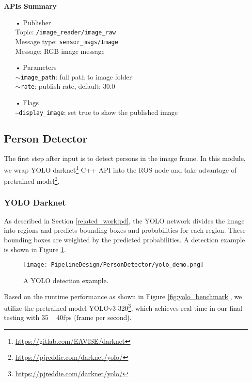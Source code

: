\textbf{APIs Summary}

\begin{itemize}
\item[•] Publisher \\
Topic: \texttt{/image\_reader/image\_raw} \\
Message type: \texttt{sensor\_msgs/Image} \\
Message: RGB image message 

\item[•] Parameters \\
\texttt{$\sim$image\_path}: full path to image folder \\
\texttt{$\sim$rate}: publish rate, default: 30.0 

\item[•] Flags \\
\texttt{---display\_image}: set true to show the published image \\
\end{itemize}


\subsection{Person Detector}
\label{pipeline:PD}
The first step after input is to detect persons in the image frame. In this module, we wrap YOLO darknet\footnote{\url{https://gitlab.com/EAVISE/darknet}} C++ API into the ROS node and take advantage of pretrained model\footnote{\url{https://pjreddie.com/darknet/yolo/}}.

\subsubsection{YOLO Darknet}
As described in Section \ref{related_work:pd}, the YOLO network \cite{DBLP:journals/corr/RedmonDGF15} divides the image into regions and predicts bounding boxes and probabilities for each region. These bounding boxes are weighted by the predicted probabilities. A detection example is shown in Figure \ref{fig:yolo_demo}. 

\begin{figure}[H]
  \centering
  \texttt{[image: PipelineDesign/PersonDetector/yolo\_demo.png]}
  \caption{A YOLO detection example.}
  \label{fig:yolo_demo}
\end{figure}

Based on the runtime performance as shown in Figure \ref{fig:yolo_benchmark}, we utilize the pretrained model YOLOv3-320\footnote{\url{https://pjreddie.com/darknet/yolo/}}, which achieves real-time in our final testing with 35 ~ 40fps (frame per second). 

